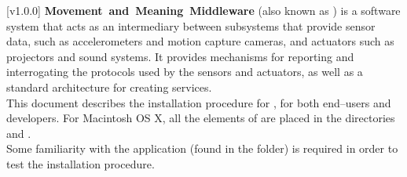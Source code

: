 [v1.0.0]
\textbf{Movement~and~Meaning~Middleware} (also known as \mplusm{}) is a software system
that acts as an intermediary between subsystems that provide sensor data, such as
accelerometers and motion capture cameras, and actuators such as projectors and sound
systems.
It provides mechanisms for reporting and interrogating the protocols used by the sensors
and actuators, as well as a standard architecture for creating services.\\

This document describes the installation procedure for \mplusm{}, for both end--users and
developers.
For Macintosh OS X, all the elements of \mplusm{} are placed in the directories
 and .\\

Some familiarity with the  application (found in the
 folder) is required in order to test the installation
procedure.
\primaryEnd{}
